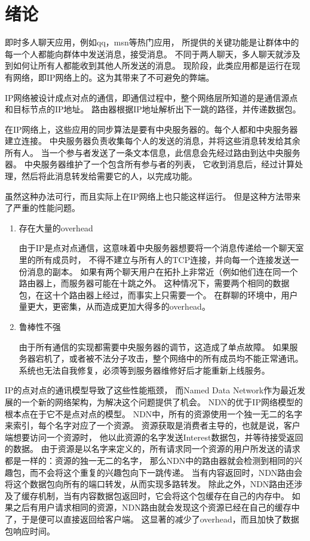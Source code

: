 
\chapter{绪论}

即时多人聊天应用，例如qq，msn等热门应用，
所提供的关键功能是让群体中的每一个人都能向群体中发送消息，接受消息。
不同于两人聊天，多人聊天就涉及到如何让所有人都能收到其他人所发送的消息。
现阶段，此类应用都是运行在现有网络，即IP网络上的。这为其带来了不可避免的弊端。

IP网络被设计成点对点的通信，即通信过程中，整个网络层所知道的是通信源点和目标节点的IP地址。
路由器根据IP地址解析出下一跳的路径，并传递数据包。

在IP网络上，这些应用的同步算法是要有中央服务器的。每个人都和中央服务器建立连接。
中央服务器负责收集每个人的发送的消息，并将这些消息转发给其余所有人。
当一个参与者发送了一条文本信息，此信息会先经过路由到达中央服务器。
中央服务器维护了一个包含所有参与者的列表，
它收到消息后，经过计算处理，然后将此消息转发给需要它的人，以完成功能。

虽然这种办法可行，而且实际上在IP网络上也只能这样运行。
但是这种方法带来了严重的性能问题。

\begin{enumerate}
\item 存在大量的overhead

由于IP是点对点通信，这意味着中央服务器想要将一个消息传递给一个聊天室里的所有成员时，
不得不建立与所有人的TCP连接，并向每一个连接发送一份消息的副本。
如果有两个聊天用户在拓扑上非常近（例如他们连在同一个路由器上，而服务器可能在十跳之外。
这种情况下，需要两个相同的数据包，在这十个路由器上经过，而事实上只需要一个。
在群聊的环境中，用户量更大，更密集，从而造成更加大得多的overhead。
\item 鲁棒性不强

由于所有通信的实现都需要中央服务器的调节，这造成了单点故障。
如果服务器宕机了，或者被不法分子攻击，整个网络中的所有成员均不能正常通讯。
系统也无法自我修复，必须等到服务器维修好后才能重新上线服务。
\end{enumerate}


IP的点对点的通讯模型导致了这些性能瓶颈，
而Named Data Network作为最近发展的一个新的网络架构，为解决这个问题提供了机会。
NDN的优于IP网络模型的根本点在于它不是点对点的模型。
NDN中，所有的资源使用一个独一无二的名字来索引，每个名字对应了一个资源。
资源获取是消费者主导的，也就是说，客户端想要访问一个资源时，
他以此资源的名字发送Interest数据包，并等待接受返回的数据。
由于资源是以名字来定义的，所有请求同一个资源的用户所发送的请求都是一样的：资源的独一无二的名字，
那么NDN中的路由器就会检测到相同的兴趣包，而不会将这个重复的兴趣包向下一跳传递。
当有内容返回时，NDN路由会将这个数据包向所有的端口转发，从而实现多路转发。
除此之外，NDN路由还涉及了缓存机制，当有内容数据包返回时，它会将这个包缓存在自己的内存中。
如果之后有用户请求相同的资源，NDN路由就会发现这个资源已经在自己的缓存中了，于是便可以直接返回给客户端。
这显著的减少了overhead，而且加快了数据包响应时间。

